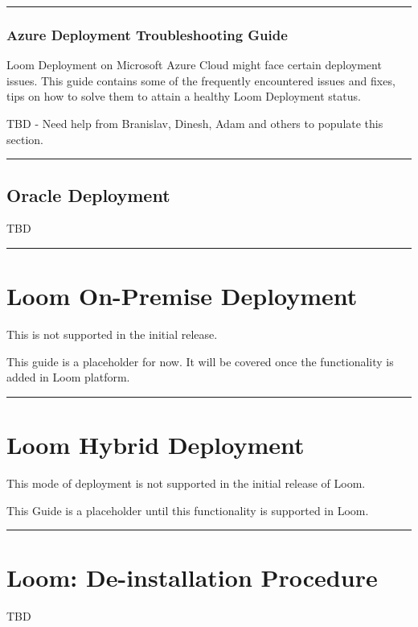 \documentclass[letterpaper,10pt,english]{sphinxmanual}
\begin{document}
\bigskip\hrule\bigskip



\subsection{Azure Deployment Troubleshooting Guide}
\label{\detokenize{loom_installation_guide:azure-deployment-troubleshooting-guide}}
Loom Deployment on Microsoft Azure Cloud might face certain deployment issues. This guide contains some of the frequently encountered issues and fixes, tips on how to solve them to attain a healthy Loom Deployment status.

TBD - Need help from Branislav, Dinesh, Adam and others to populate this section.


\bigskip\hrule\bigskip



\section{Oracle Deployment}
\label{\detokenize{loom_installation_guide:oracle-deployment}}
TBD


\bigskip\hrule\bigskip



\chapter{Loom On-Premise Deployment}
\label{\detokenize{loom_installation_guide:loom-on-premise-deployment}}\label{\detokenize{loom_installation_guide:ing-com-on-prem-install}}
This is not supported in the initial release.

This guide is a placeholder for now.  It will be covered once the functionality is added in Loom platform.


\bigskip\hrule\bigskip



\chapter{Loom Hybrid Deployment}
\label{\detokenize{loom_installation_guide:loom-hybrid-deployment}}
This mode of deployment is not supported in the initial release of Loom.

This Guide is a placeholder until this functionality is supported in Loom.


\bigskip\hrule\bigskip



\chapter{Loom: De-installation Procedure}
\label{\detokenize{loom_installation_guide:loom-de-installation-procedure}}
TBD
\end{document}
